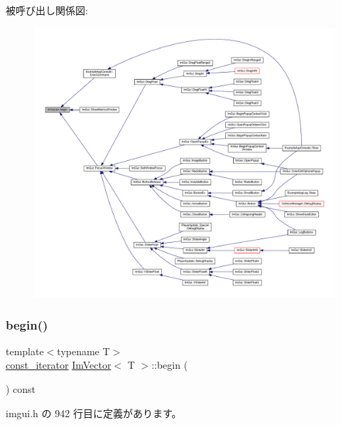 被呼び出し関係図\+:\nopagebreak
\begin{figure}[H]
\begin{center}
\leavevmode
\includegraphics[width=350pt]{class_im_vector_a300a8b559cd87a78063046ef81151bce_icgraph}
\end{center}
\end{figure}
\mbox{\label{class_im_vector_ac72cd4105b5c6a7f76157df945b39d4c}} 
\subsubsection{\texorpdfstring{begin()}{begin()}\hspace{0.1cm}{\footnotesize\ttfamily [2/2]}}
{\footnotesize\ttfamily template$<$typename T$>$ \\
\mbox{\hyperlink{class_im_vector_aedeac9c5080f9d6ce96ae837768ee4c4}{const\+\_\+iterator}} \mbox{\hyperlink{class_im_vector}{Im\+Vector}}$<$ T $>$\+::begin (\begin{DoxyParamCaption}{ }\end{DoxyParamCaption}) const\hspace{0.3cm}{\ttfamily [inline]}}



 imgui.\+h の 942 行目に定義があります。

\mbox{\label{class_im_vector_ac17681baa8b9b5cd97e556da29f9ef73}} 
